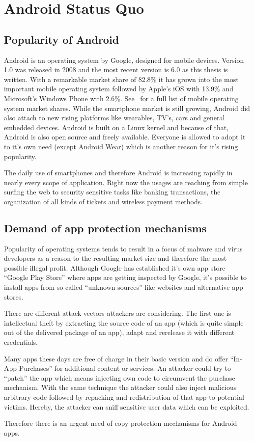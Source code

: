 \chapter{Android Status Quo}\label{chapter:android_status_quo}

\section{Popularity of Android}
Android is an operating system by Google,
designed for mobile devices. Version 1.0 was released
in 2008 and the most recent version is 6.0 as this thesis
is written. With a remarkable market share of 82.8\%
it has grown into the most important mobile operating system
followed by Apple's iOS with 13.9\% and Microsoft's Windows
Phone with 2.6\%. See~\parencite{marketsharea} for a full list
of mobile operating system market shares. While the smartphone
market is still growing, Android did also attach to new
rising platforms like wearables, TV's, cars and general
embedded devices. Android is built on a Linux kernel
and because of that, Android is also open source and freely
available. Everyone is allowed to adopt it to it's own need
(except Android Wear) which is another reason for it's
rising popularity.

The daily use of smartphones and therefore Android is increasing
rapidly in nearly every scope of application. Right now the usages
are reaching from simple surfing the web to security sensitive tasks
like banking transactions, the organization of all kinds of tickets
and wireless payment methods.

\section{Demand of app protection mechanisms}
Popularity of operating systems tends to result in a focus of
malware and virus developers as a reason to the resulting market
size and therefore the most possible illegal profit.
Although Google has established it's own app store
``Google Play Store'' where apps are getting inspected by Google,
it's possible to install apps from so called ``unknown sources''
like websites and alternative app stores.

There are different attack vectors attackers are considering.
The first one is intellectual theft by extracting the source
code of an app (which is quite simple out of the delivered
package of an app), adapt and rerelease it with different credentials.


Many apps these days are free of charge in their basic version and
do offer ``In-App Purchases'' for additional content or services.
An attacker could try to ``patch'' the app which means
injecting own code to circumvent the purchase mechanism.
With the same technique the attacker could also inject malicious
arbitrary code followed by repacking and redistribution of that
app to potential victims. Hereby, the attacker can sniff
sensitive user data which can be exploited.

Therefore there is an urgent need of copy protection mechanisms
for Android apps.
